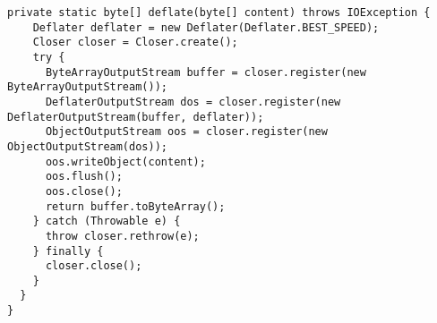 \begin{lstlisting}[caption={Запись wal файла}]
  private static byte[] deflate(byte[] content) throws IOException {
    Deflater deflater = new Deflater(Deflater.BEST_SPEED);
    Closer closer = Closer.create();
    try {
      ByteArrayOutputStream buffer = closer.register(new ByteArrayOutputStream());
      DeflaterOutputStream dos = closer.register(new DeflaterOutputStream(buffer, deflater));
      ObjectOutputStream oos = closer.register(new ObjectOutputStream(dos));
      oos.writeObject(content);
      oos.flush();
      oos.close();
      return buffer.toByteArray();
    } catch (Throwable e) {
      throw closer.rethrow(e);
    } finally {
      closer.close();
    }
  }
}
\end{lstlisting}